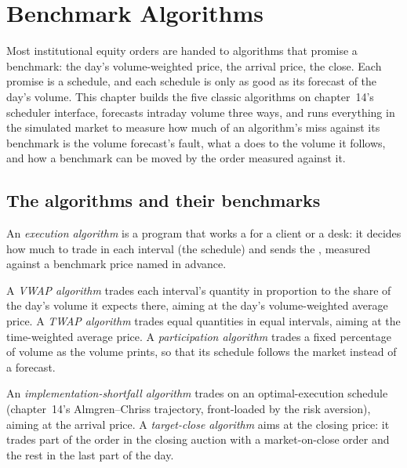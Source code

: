 \chapter{Benchmark Algorithms}\label{ch:mx:benchmark-algorithms}

Most institutional equity orders are handed to algorithms that promise a benchmark: the day's volume-weighted price, the arrival price, the close.
Each promise is a schedule, and each schedule is only as good as its forecast of the day's volume. This chapter builds the five classic algorithms on
chapter~14's scheduler interface, forecasts intraday volume three ways, and runs everything in the simulated market to measure how much of an
algorithm's miss against its benchmark is the volume forecast's fault, what a  does to the volume it follows, and how a
benchmark can be moved by the order measured against it.

\section{The algorithms and their benchmarks}

\begin{definition}\label{def:mx:benchmark-algorithms:algo}
An \emph{execution algorithm} is a program that works a  for a client or a desk: it decides how much to trade
in each interval (the schedule) and sends the , measured against a benchmark price named in advance.
\end{definition}

\begin{definition}\label{def:mx:benchmark-algorithms:vwap}
A \emph{VWAP algorithm} trades each interval's quantity in proportion to the share of the day's volume it expects there, aiming
at the day's volume-weighted average price. A \emph{TWAP algorithm} trades equal quantities in equal intervals, aiming at the
time-weighted average price. A \emph{participation algorithm} trades a fixed percentage of volume as the volume prints,
so that its schedule follows the market instead of a forecast.
\end{definition}

\begin{definition}\label{def:mx:benchmark-algorithms:is}
An \emph{implementation-shortfall algorithm} trades on an optimal-execution schedule (chapter~14's
Almgren--Chriss trajectory, front-loaded by the risk aversion), aiming at the arrival price. A \emph{target-close algorithm} aims at the closing price: it trades part of the order in the closing auction with a market-on-close order and the rest in the last
part of the day.
\end{definition}

